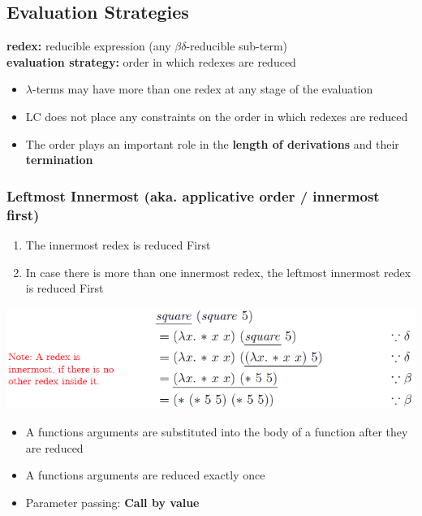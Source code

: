 \subsection{Evaluation Strategies}
\textbf{redex:} reducible expression (any $\beta \delta$-reducible sub-term)\\ 
\textbf{evaluation strategy:} order in which redexes are reduced
\begin{itemize}
    \item $\lambda$-terms may have more than one redex at any stage of the evaluation
    \item LC does not place any constraints on the order in which redexes are reduced
    \item The order plays an important role in the \textbf{length of derivations} and their \textbf{termination}
\end{itemize}

\subsubsection{Leftmost Innermost (aka. applicative order / innermost first)}
\begin{enumerate}
    \item The innermost redex is reduced First
    \item In case there is more than one innermost redex, the leftmost innermost redex is reduced First
\end{enumerate}
\includegraphics[width=0.9\linewidth]{img/lc_innermost.png}
\begin{itemize}
    \item A functions arguments are substituted into the body of a function after they are reduced
    \item A functions arguments are reduced exactly once
    \item Parameter passing: \textbf{Call by value}
\end{itemize}

